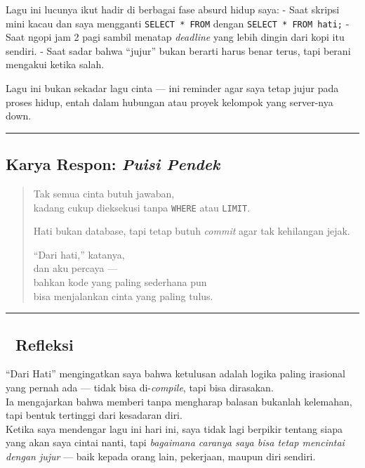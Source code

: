 \documentclass[
  letterpaper,
  DIV=11,
  numbers=noendperiod]{scrreprt}
\begin{document}
Lagu ini lucunya ikut hadir di berbagai fase absurd hidup saya: - Saat
skripsi mini kacau dan saya mengganti \texttt{SELECT\ *\ FROM} dengan
\texttt{SELECT\ *\ FROM\ hati;} - Saat ngopi jam 2 pagi sambil menatap
\emph{deadline} yang lebih dingin dari kopi itu sendiri. - Saat sadar
bahwa ``jujur'' bukan berarti harus benar terus, tapi berani mengakui
ketika salah.

Lagu ini bukan sekadar lagu cinta --- ini reminder agar saya tetap jujur
pada proses hidup, entah dalam hubungan atau proyek kelompok yang
server-nya down.

\begin{center}\rule{0.5\linewidth}{0.5pt}\end{center}

\subsection{\texorpdfstring{Karya Respon: \emph{Puisi
Pendek}}{Karya Respon: Puisi Pendek}}\label{karya-respon-puisi-pendek}

\begin{quote}
Tak semua cinta butuh jawaban,\\
kadang cukup dieksekusi tanpa \texttt{WHERE} atau \texttt{LIMIT}.

Hati bukan database, tapi tetap butuh \emph{commit} agar tak kehilangan
jejak.

``Dari hati,'' katanya,\\
dan aku percaya ---\\
bahkan kode yang paling sederhana pun\\
bisa menjalankan cinta yang paling tulus.
\end{quote}

\begin{center}\rule{0.5\linewidth}{0.5pt}\end{center}

\subsection{💭 Refleksi}\label{refleksi}

``Dari Hati'' mengingatkan saya bahwa ketulusan adalah logika paling
irasional yang pernah ada --- tidak bisa di-\emph{compile}, tapi bisa
dirasakan.\\
Ia mengajarkan bahwa memberi tanpa mengharap balasan bukanlah kelemahan,
tapi bentuk tertinggi dari kesadaran diri.\\
Ketika saya mendengar lagu ini hari ini, saya tidak lagi berpikir
tentang siapa yang akan saya cintai nanti, tapi \emph{bagaimana caranya
saya bisa tetap mencintai dengan jujur} --- baik kepada orang lain,
pekerjaan, maupun diri sendiri.
\end{document}
